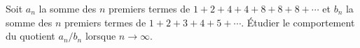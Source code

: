 Soit $a_n$ la somme des $n$ premiers termes de $1 + 2 + 4 + 4 + 8 + 8 + 8 + \cdots$ et $b_n$ la somme des $n$ premiers termes de $1 + 2 + 3 + 4 + 5 + \cdots$. Étudier le comportement du quotient $a_n/b_n$ lorsque $n \to \infty$.
